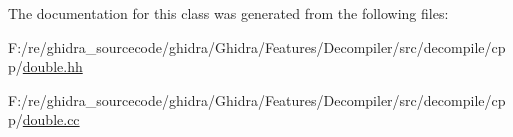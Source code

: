 The documentation for this class was generated from the following files\+:\begin{DoxyCompactItemize}
\item 
F\+:/re/ghidra\+\_\+sourcecode/ghidra/\+Ghidra/\+Features/\+Decompiler/src/decompile/cpp/\mbox{\hyperlink{double_8hh}{double.\+hh}}\item 
F\+:/re/ghidra\+\_\+sourcecode/ghidra/\+Ghidra/\+Features/\+Decompiler/src/decompile/cpp/\mbox{\hyperlink{double_8cc}{double.\+cc}}\end{DoxyCompactItemize}
